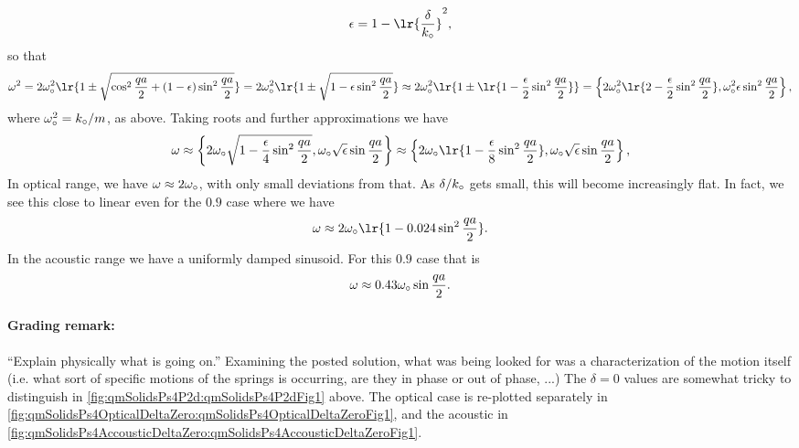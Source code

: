 {\begin{equation}
\epsilon = 1 - \lr{\frac{\delta}{k_\nought}}^2,
\end{equation}
%
so that
%
\begin{dmath}\label{eqn:condensedMatterProblemSet4Problem2:760}
\omega^2
= 2 \omega_\nought^2 \lr{ 1 \pm \sqrt{ \cos^2\frac{qa}{2} + (1 - \epsilon) \sin^2 \frac{qa}{2}} }
= 2 \omega_\nought^2 \lr{ 1 \pm \sqrt{ 1 - \epsilon \sin^2 \frac{qa}{2}} }
\approx 2 \omega_\nought^2 \lr{ 1 \pm \lr{ 1 - \frac{\epsilon}{2} \sin^2 \frac{qa}{2}} }
=
\left\{2 \omega_\nought^2 \lr{ 2 - \frac{\epsilon}{2} \sin^2 \frac{qa}{2} },
\omega_\nought^2 \epsilon \sin^2 \frac{qa}{2}
\right\},
\end{dmath}
%
where \(\omega_\circ^2 = k_\circ/m\), as above.  Taking roots and further approximations we have
%
\begin{dmath}\label{eqn:condensedMatterProblemSet4Problem2:780}
\omega
\approx
\left\{2 \omega_\nought \sqrt{ 1 - \frac{\epsilon}{4} \sin^2 \frac{qa}{2} },
\omega_\nought \sqrt{\epsilon} \sin \frac{qa}{2}
\right\}
\approx
\left\{
2 \omega_\nought \lr{ 1 - \frac{\epsilon}{8} \sin^2 \frac{qa}{2} },
\omega_\nought \sqrt{\epsilon} \sin \frac{qa}{2}
\right\},
\end{dmath}
%
In optical  range, we have \(\omega \approx 2 \omega_\circ\), with only small deviations from that.  As \(\delta/k_\circ\) gets small, this will become increasingly flat.  In fact, we see this close to linear even for the \(0.9\) case where we have
%
\begin{dmath}\label{eqn:condensedMatterProblemSet4Problem2:800}
\omega \approx
2 \omega_\nought \lr{ 1 - 0.024 \sin^2 \frac{qa}{2} }.
\end{dmath}
%
In the acoustic  range we have a uniformly damped sinusoid.  For this \(0.9\) case that is
%
\begin{equation}\label{eqn:condensedMatterProblemSet4Problem2:720}
\omega \approx 0.43 \omega_\circ \sin \frac{qa}{2}.
\end{equation}
%
\paragraph{Grading remark:} ``Explain physically what is going on.''  Examining the posted solution, what was being looked for was a characterization of the motion itself (i.e. what sort of specific motions of the springs is occurring, are they in phase or out of phase, ...)
The \(\delta = 0\) values are somewhat tricky to distinguish in \cref{fig:qmSolidsPs4P2d:qmSolidsPs4P2dFig1} above.  The optical case is re-plotted separately in \cref{fig:qmSolidsPs4OpticalDeltaZero:qmSolidsPs4OpticalDeltaZeroFig1}, and the acoustic in \cref{fig:qmSolidsPs4AccousticDeltaZero:qmSolidsPs4AccousticDeltaZeroFig1}.
%
}
